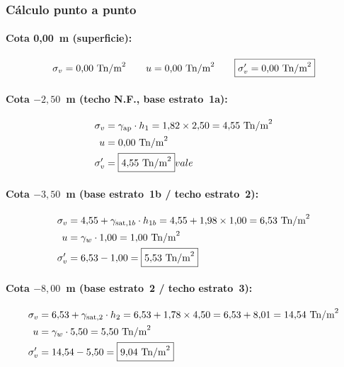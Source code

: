\subsubsection{Cálculo punto a punto}

\paragraph{Cota 0,00~m (superficie):}
\begin{equation*}
  \sigma_v = 0{,}00~\text{Tn/m}^2 \qquad u = 0{,}00~\text{Tn/m}^2
  \qquad \boxed{\sigma'_v = 0{,}00~\text{Tn/m}^2}
\end{equation*}

\paragraph{Cota $-2{,}50$~m (techo N.F., base estrato~1a):}
\begin{align*}
  \sigma_v   &= \gamma_{\text{ap}} \cdot h_1
               = 1{,}82 \times 2{,}50 = 4{,}55~\text{Tn/m}^2 \\
  u          &= 0{,}00~\text{Tn/m}^2 \\
  \sigma'_v  &= \boxed{4{,}55~\text{Tn/m}^2}
vale \end{align*}

\paragraph{Cota $-3{,}50$~m (base estrato~1b / techo estrato~2):}
\begin{align*}
  \sigma_v   &= 4{,}55 + \gamma_{\text{sat},1b} \cdot h_{1b}
               = 4{,}55 + 1{,}98 \times 1{,}00 = 6{,}53~\text{Tn/m}^2 \\
  u          &= \gamma_w \cdot 1{,}00 = 1{,}00~\text{Tn/m}^2 \\
  \sigma'_v  &= 6{,}53 - 1{,}00 = \boxed{5{,}53~\text{Tn/m}^2}
\end{align*}

\paragraph{Cota $-8{,}00$~m (base estrato~2 / techo estrato~3):}
\begin{align*}
  \sigma_v   &= 6{,}53 + \gamma_{\text{sat},2} \cdot h_2
               = 6{,}53 + 1{,}78 \times 4{,}50 = 6{,}53 + 8{,}01 = 14{,}54~\text{Tn/m}^2 \\
  u          &= \gamma_w \cdot 5{,}50 = 5{,}50~\text{Tn/m}^2 \\
  \sigma'_v  &= 14{,}54 - 5{,}50 = \boxed{9{,}04~\text{Tn/m}^2}
\end{align*}

